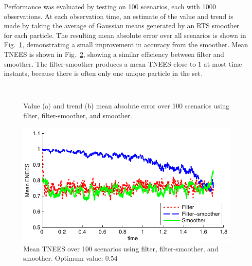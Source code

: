 \documentclass[peerreview,11pt,draftcls,onecolumn]{IEEEtran}
\begin{document}
%
Performance was evaluated by testing on 100 scenarios, each with 1000 observations. At each observation time, an estimate of the value and trend is made by taking the average of Gaussian means generated by an RTS smoother for each particle. The resulting mean absolute error over all scenarios is shown in Fig.~\ref{fig:finance_rmse}, demonstrating a small improvement in accuracy from the smoother. Mean TNEES is shown in Fig.~\ref{fig:finance_mtnees}, showing a similar efficiency between filter and smoother. The filter-smoother produces a mean TNEES close to $1$ at most time instants, because there is often only one unique particle in the set.%
%
\begin{figure}[!t]
\centering
{} \\
\caption{Value (a) and trend (b) mean absolute error over 100 scenarios using filter, filter-smoother, and smoother.}
\label{fig:finance_rmse}
\end{figure}
%
\begin{figure}[!t]
\centering
\includegraphics[width=0.45\columnwidth]{finance_mtnees.pdf}
\caption{Mean TNEES over 100 scenarios using filter, filter-smoother, and smoother. Optimum value: 0.54}
\label{fig:finance_mtnees}
\end{figure}
\end{document}
